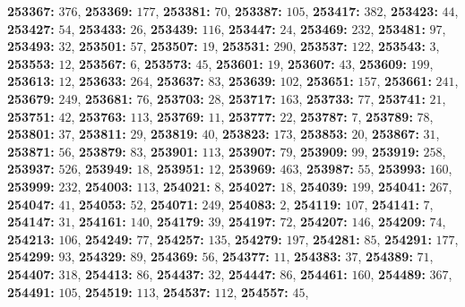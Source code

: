 \textsf{\bfseries 253367:} $376$, \textsf{\bfseries 253369:} $177$, \textsf{\bfseries 253381:} $70$, \textsf{\bfseries 253387:} $105$, \textsf{\bfseries 253417:} $382$, \textsf{\bfseries 253423:} $44$, \textsf{\bfseries 253427:} $54$, \textsf{\bfseries 253433:} $26$, \textsf{\bfseries 253439:} $116$, \textsf{\bfseries 253447:} $24$, \textsf{\bfseries 253469:} $232$, \textsf{\bfseries 253481:} $97$, \textsf{\bfseries 253493:} $32$, \textsf{\bfseries 253501:} $57$, \textsf{\bfseries 253507:} $19$, \textsf{\bfseries 253531:} $290$, \textsf{\bfseries 253537:} $122$, \textsf{\bfseries 253543:} $3$, \textsf{\bfseries 253553:} $12$, \textsf{\bfseries 253567:} $6$, \textsf{\bfseries 253573:} $45$, \textsf{\bfseries 253601:} $19$, \textsf{\bfseries 253607:} $43$, \textsf{\bfseries 253609:} $199$, \textsf{\bfseries 253613:} $12$, \textsf{\bfseries 253633:} $264$, \textsf{\bfseries 253637:} $83$, \textsf{\bfseries 253639:} $102$, \textsf{\bfseries 253651:} $157$, \textsf{\bfseries 253661:} $241$, \textsf{\bfseries 253679:} $249$, \textsf{\bfseries 253681:} $76$, \textsf{\bfseries 253703:} $28$, \textsf{\bfseries 253717:} $163$, \textsf{\bfseries 253733:} $77$, \textsf{\bfseries 253741:} $21$, \textsf{\bfseries 253751:} $42$, \textsf{\bfseries 253763:} $113$, \textsf{\bfseries 253769:} $11$, \textsf{\bfseries 253777:} $22$, \textsf{\bfseries 253787:} $7$, \textsf{\bfseries 253789:} $78$, \textsf{\bfseries 253801:} $37$, \textsf{\bfseries 253811:} $29$, \textsf{\bfseries 253819:} $40$, \textsf{\bfseries 253823:} $173$, \textsf{\bfseries 253853:} $20$, \textsf{\bfseries 253867:} $31$, \textsf{\bfseries 253871:} $56$, \textsf{\bfseries 253879:} $83$, \textsf{\bfseries 253901:} $113$, \textsf{\bfseries 253907:} $79$, \textsf{\bfseries 253909:} $99$, \textsf{\bfseries 253919:} $258$, \textsf{\bfseries 253937:} $526$, \textsf{\bfseries 253949:} $18$, \textsf{\bfseries 253951:} $12$, \textsf{\bfseries 253969:} $463$, \textsf{\bfseries 253987:} $55$, \textsf{\bfseries 253993:} $160$, \textsf{\bfseries 253999:} $232$, \textsf{\bfseries 254003:} $113$, \textsf{\bfseries 254021:} $8$, \textsf{\bfseries 254027:} $18$, \textsf{\bfseries 254039:} $199$, \textsf{\bfseries 254041:} $267$, \textsf{\bfseries 254047:} $41$, \textsf{\bfseries 254053:} $52$, \textsf{\bfseries 254071:} $249$, \textsf{\bfseries 254083:} $2$, \textsf{\bfseries 254119:} $107$, \textsf{\bfseries 254141:} $7$, \textsf{\bfseries 254147:} $31$, \textsf{\bfseries 254161:} $140$, \textsf{\bfseries 254179:} $39$, \textsf{\bfseries 254197:} $72$, \textsf{\bfseries 254207:} $146$, \textsf{\bfseries 254209:} $74$, \textsf{\bfseries 254213:} $106$, \textsf{\bfseries 254249:} $77$, \textsf{\bfseries 254257:} $135$, \textsf{\bfseries 254279:} $197$, \textsf{\bfseries 254281:} $85$, \textsf{\bfseries 254291:} $177$, \textsf{\bfseries 254299:} $93$, \textsf{\bfseries 254329:} $89$, \textsf{\bfseries 254369:} $56$, \textsf{\bfseries 254377:} $11$, \textsf{\bfseries 254383:} $37$, \textsf{\bfseries 254389:} $71$, \textsf{\bfseries 254407:} $318$, \textsf{\bfseries 254413:} $86$, \textsf{\bfseries 254437:} $32$, \textsf{\bfseries 254447:} $86$, \textsf{\bfseries 254461:} $160$, \textsf{\bfseries 254489:} $367$, \textsf{\bfseries 254491:} $105$, \textsf{\bfseries 254519:} $113$, \textsf{\bfseries 254537:} $112$, \textsf{\bfseries 254557:} $45$, 
